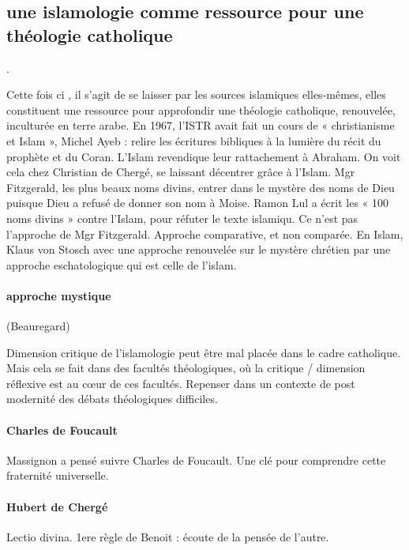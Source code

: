 \subsection{une islamologie comme ressource pour une théologie catholique} . 

Cette fois ci , il s’agit de se laisser par les sources islamiques elles-mêmes, elles constituent une ressource pour approfondir une théologie catholique, renouvelée, inculturée en terre arabe. En 1967, l’ISTR avait fait un cours de « christianisme et Islam », Michel Ayeb : relire les écritures bibliques à la lumière du récit du prophète et du Coran. L’Islam revendique leur rattachement à Abraham.  On voit cela chez Christian de Chergé, se laissant décentrer grâce à l’Islam. Mgr Fitzgerald, les plus beaux noms divins, entrer dans le mystère des noms de Dieu puisque Dieu a refusé de donner son nom à Moise. Ramon Lul a écrit les « 100 noms divins » contre l’Islam, pour réfuter le texte islamiqu. Ce n’est pas l’approche de Mgr Fitzgerald. Approche comparative, et non comparée. En Islam, Klaus von Stosch  avec une approche renouvelée sur le mystère chrétien par une approche eschatologique qui est celle de l’islam. 

\paragraph{approche mystique} (Beauregard)



Dimension critique de l’islamologie peut être mal placée dans le cadre catholique. Mais cela se fait dans des facultés théologiques, où la critique / dimension réflexive est au cœur de ces facultés. Repenser dans un contexte de post modernité des débats théologiques difficiles.


\paragraph{Charles de Foucault}
Massignon a pensé suivre Charles de Foucault. Une clé pour comprendre cette fraternité universelle. 

\paragraph{Hubert de Chergé}
Lectio divina. 1ere règle de Benoit : écoute de la pensée de l’autre. 

